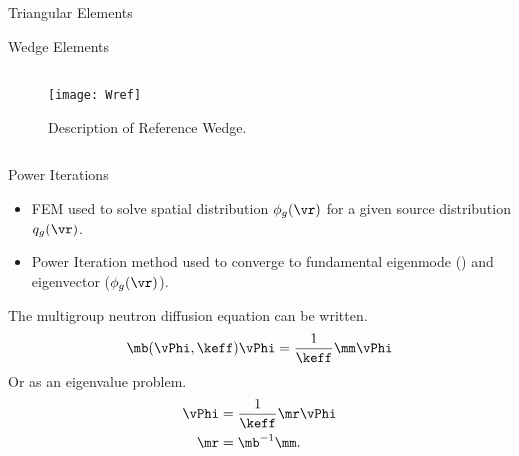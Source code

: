 \begin{frame}{Triangular Elements}
  \begin{figure}
    \centering
    \vspace{0.2in}
    \label{fig:triangle_elements}
  \end{figure}
\end{frame}

\begin{frame}{Wedge Elements}
  \begin{columns}
    \begin{column}{0.5\textwidth}
      \vspace*{\fill}
      \begin{figure}
        \centering
        \texttt{[image: Wref]}
        \caption{Description of Reference Wedge.}
        \label{fig:Wref}
      \end{figure}
      \vspace*{\fill}
    \end{column}
    \begin{column}{0.5\textwidth}
      \begin{figure}
        \centering
        \hspace{0.1\textwidth}
        \label{fig:sketch_wedge}
      \end{figure}
    \end{column}
  \end{columns}
\end{frame}

\begin{frame}{Power Iterations}
  \begin{itemize}
    \item FEM used to solve spatial distribution $\phi_g(\vr)$ for a given
      source distribution $q_g(\vr)$.
    \item Power Iteration method used to converge to fundamental eigenmode
      (\keff) and eigenvector ($\phi_g(\vr)$).
  \end{itemize}

  The multigroup neutron diffusion equation can be written.
  \begin{equation}
    \label{eq:gehin_notation}
    \mb(\vPhi,\keff) \vPhi = \frac{1}{\keff} \mm \vPhi
  \end{equation}
  Or as an eigenvalue problem.
  \begin{align}
    \label{eq:gehin_solution}
    \vPhi &= \frac{1}{\keff} \mr \vPhi \\
    \label{eq:gehin_r}
    \mr &= \mb^{-1} \mm.
  \end{align}
\end{frame}

